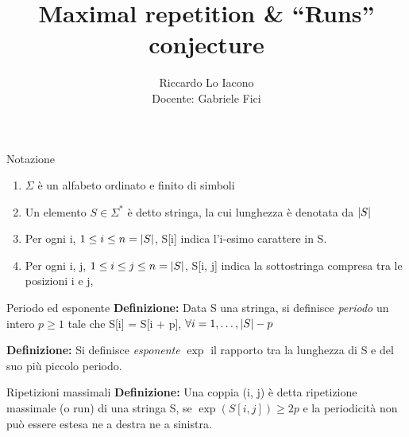 \documentclass{beamer}
\title{Maximal repetition \& ``Runs'' conjecture}
\author{Riccardo Lo Iacono \\ \footnotesize{Docente: Gabriele Fici}}
\begin{document}
    \begin{frame}
        \maketitle
    \end{frame}
    \begin{frame}{Notazione}
        \begin{enumerate}
            \item \(\Sigma\) è un alfabeto ordinato e finito di simboli
            \item Un elemento \(S \in \Sigma^{*}\) è detto stringa,
                la cui lunghezza è denotata da \(\left\lvert S \right\rvert\)
            \item Per ogni i, \(1 \le i \le n = \left\lvert S \right\rvert\), 
                S[i] indica l'i-esimo carattere in S.
            \item Per ogni i, j, \(1 \le i \le j \le n = \left\lvert S \right\rvert\),
                S[i, j] indica la sottostringa compresa tra le 
                posizioni i e j, 
        \end{enumerate}
    \end{frame}
    \begin{frame}{Periodo ed esponente}
        \textbf{Definizione: } Data S una stringa,
        si definisce \emph{periodo} un intero \(p \ge 1\)
        tale che S[i] = S[i + p], \(\forall i = 1, \ldots, \left\lvert S \right\rvert - p\)

        \textbf{Definizione: } Si definisce \emph{esponente} \(\exp\)
        il rapporto tra la lunghezza di S e del suo più piccolo periodo.
    \end{frame}
    \begin{frame}{Ripetizioni massimali}
        \textbf{Definizione: } Una coppia (i, j) è detta ripetizione massimale
        (o run) di una stringa S, se \(\exp(S[i, j]) \ge 2p\) e la periodicità
        non può essere estesa ne a destra ne a sinistra.
    \end{frame}
\end{document}
